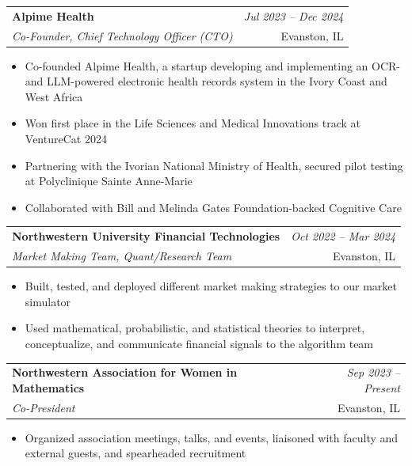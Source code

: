 \documentclass[a4paper,11pt]{article}
\makeatletter
\newcommand{\resumeSubheading}[4]{
\vspace{0.5mm}\item
    \begin{tabular*}{0.98\textwidth}[t]{l@{\extracolsep{\fill}}r}
        \textbf{#1} & \textit{\footnotesize{#4}} \\
        \textit{\footnotesize{#3}} &  \footnotesize{#2}\\
    \end{tabular*}
    \vspace{-2.4mm}
}
\newcommand{\resumeItemListStart}{\begin{itemize}[leftmargin=*,labelsep=1mm,itemsep=0.5mm]}
\newcommand{\resumeItemListEnd}{\end{itemize}\vspace{-2mm}}
\makeatother
\begin{document}
\resumeSubheading
    {Alpime Health}{Evanston, IL}
    {Co-Founder, Chief Technology Officer (CTO)}{Jul 2023 – Dec 2024}
    \resumeItemListStart
      \item Co-founded Alpime Health, a startup developing and implementing an OCR- and LLM-powered electronic health records system in the Ivory Coast and West Africa
      \item Won first place in the Life Sciences and Medical Innovations track at VentureCat 2024
      \item Partnering with the Ivorian National Ministry of Health, secured pilot testing at Polyclinique Sainte Anne-Marie
      \item Collaborated with Bill and Melinda Gates Foundation-backed Cognitive Care
    \resumeItemListEnd
    
\resumeSubheading
    {Northwestern University Financial Technologies}{Evanston, IL}
    {Market Making Team, Quant/Research Team}{Oct 2022 – Mar 2024}
    \resumeItemListStart
      \item Built, tested, and deployed different market making strategies to our market simulator
      \item Used mathematical, probabilistic, and statistical theories to interpret, conceptualize, and communicate financial signals to the algorithm team 
    \resumeItemListEnd

\resumeSubheading
    {Northwestern Association for Women in Mathematics}{Evanston, IL}
    {Co-President}{Sep 2023 – Present}
    \resumeItemListStart
      \item Organized association meetings, talks, and events, liaisoned with faculty and external guests, and spearheaded recruitment
    \resumeItemListEnd

\end{document}
